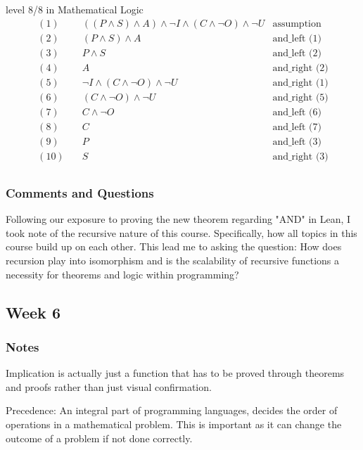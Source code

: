 \documentclass{article}
\theoremstyle{theorem}
\theoremstyle{definition}
\theoremstyle{remark}
\begin{document}
level 8/8 in Mathematical Logic
\[
\begin{aligned}
    (1) &\quad ((P \land S) \land A) \land \neg I \land (C \land \neg O) \land \neg U & \text{assumption} \\
    (2) &\quad (P \land S) \land A & \text{and\_left (1)} \\
    (3) &\quad P \land S & \text{and\_left (2)} \\
    (4) &\quad A & \text{and\_right (2)} \\
    (5) &\quad \neg I \land (C \land \neg O) \land \neg U & \text{and\_right (1)} \\
    (6) &\quad (C \land \neg O) \land \neg U & \text{and\_right (5)} \\
    (7) &\quad C \land \neg O & \text{and\_left (6)} \\
    (8) &\quad C & \text{and\_left (7)} \\
    (9) &\quad P & \text{and\_left (3)} \\
    (10) &\quad S & \text{and\_right (3)} \\
\end{aligned}
\]

\subsubsection*{Comments and Questions}

Following our exposure to proving the new theorem regarding "AND" in Lean, I took note of the recursive nature of this course. Specifically, how all topics in this course build up on each other. This lead me to asking the question: How does recursion play into isomorphism and is the scalability of recursive functions a necessity for theorems and logic within programming?


\subsection{Week 6}

\subsubsection*{Notes}

Implication is actually just a function that has to be proved through theorems and proofs rather than just visual confirmation.

Precedence: An integral part of programming languages, decides the order of operations in a mathematical problem. This is important as it can change the outcome of a problem if not done correctly.
\end{document}

